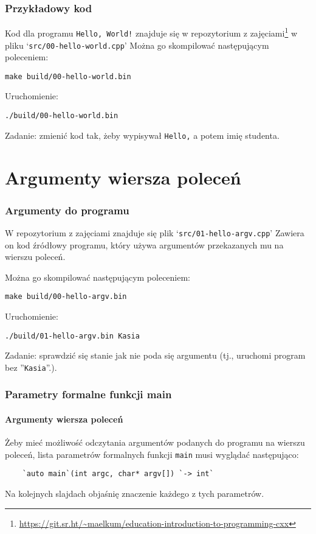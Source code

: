\documentclass[aspectratio=169]{beamer}
\begin{document}
\begin{frame}
    \frametitle{Przykładowy kod}

    Kod dla programu {\tt Hello, World!} znajduje się w repozytorium z
    zajęciami\footnote{\url{https://git.sr.ht/~maelkum/education-introduction-to-programming-cxx}}
    w pliku `{\tt src/00-hello-world.cpp}'
    Można go skompilować następującym poleceniem:

    \vspace{1em}
    {\tt make build/00-hello-world.bin}
    \vspace{1em}

    Uruchomienie:

    \vspace{1em}
    {\tt ./build/00-hello-world.bin}
    \vspace{1em}

    Zadanie: zmienić kod tak, żeby wypisywał {\tt Hello,} a potem imię studenta.
\end{frame}

\section{Argumenty wiersza poleceń}

\begin{frame}
    \frametitle{Argumenty do programu}

    W repozytorium z zajęciami znajduje się plik `{\tt src/01-hello-argv.cpp}'
    Zawiera on kod źródłowy programu, który używa argumentów przekazanych mu na
    wierszu poleceń.

    Można go skompilować następującym poleceniem:

    \vspace{1em}
    {\tt make build/00-hello-argv.bin}
    \vspace{1em}

    Uruchomienie:

    \vspace{1em}
    {\tt ./build/01-hello-argv.bin Kasia}
    \vspace{1em}

    Zadanie: sprawdzić się stanie jak nie poda się argumentu (tj., uruchomi
    program bez ''{\tt Kasia}''.).
\end{frame}

\begin{frame}[fragile]
    \frametitle{Parametry formalne funkcji main}
    \framesubtitle{Argumenty wiersza poleceń}

    Żeby mieć możliwość odczytania argumentów podanych do programu na wierszu
    poleceń, lista parametrów formalnych funkcji {\tt main} musi wyglądać
    następująco:

    \vspace{1em}
    \begin{lstlisting}
    `auto main`(int argc, char* argv[]) `-> int`
    \end{lstlisting}
    \vspace{1em}

    Na kolejnych slajdach objaśnię znaczenie każdego z tych parametrów.
\end{frame}
\end{document}
